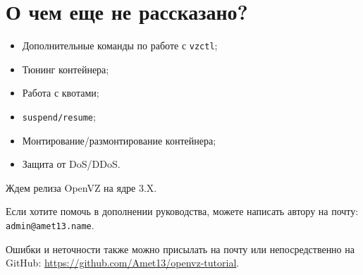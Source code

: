 \section{О чем еще не рассказано?}

\begin{itemize}
    \item Дополнительные команды по работе с \texttt{vzctl};
    \item Тюнинг контейнера;
    \item Работа с квотами;
    \item \texttt{suspend/resume};
    \item Монтирование/размонтирование контейнера;
    \item Защита от DoS/DDoS.
\end{itemize}

Ждем релиза OpenVZ на ядре 3.X.

Если хотите помочь в дополнении руководства, можете написать автору на почту: \texttt{admin@amet13.name}.

Ошибки и неточности также можно присылать на почту или непосредственно на GitHub: \url{https://github.com/Amet13/openvz-tutorial}.

\clearpage
